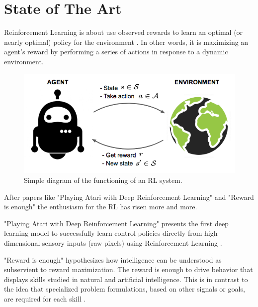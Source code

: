 \section{State of The Art}

Reinforcement Learning is about use observed rewards to learn an optimal (or nearly optimal) 
policy for the environment \cite{russell2002artificial}. In other words, it is maximizing an 
agent's reward by performing a series of actions in response to a dynamic environment.

\begin{figure}[ht]
    \centering
    \includegraphics[scale=0.4]{images/RL_illustration.png}
    \caption{Simple diagram of the functioning of an RL system.}
    \label{fig:RL_illustration}
\end{figure}

After papers like "Playing Atari with Deep Reinforcement Learning"\cite{mnih2013playing} and "Reward is enough"\cite{silver2021reward} the enthusiasm for the RL has risen more and more. 

"Playing Atari with Deep Reinforcement Learning" presents the first deep learning model to successfully learn control policies directly from high-dimensional sensory inputs (raw pixels) using Reinforcement Learning \cite{mnih2013playing}.

"Reward is enough" hypothesizes how intelligence can be understood as subservient to reward maximization. The reward is enough to drive behavior that displays skills studied in natural and artificial intelligence. This is in contrast to the idea that specialized problem formulations, based on other signals or goals, are required for each skill \cite{silver2021reward}.

